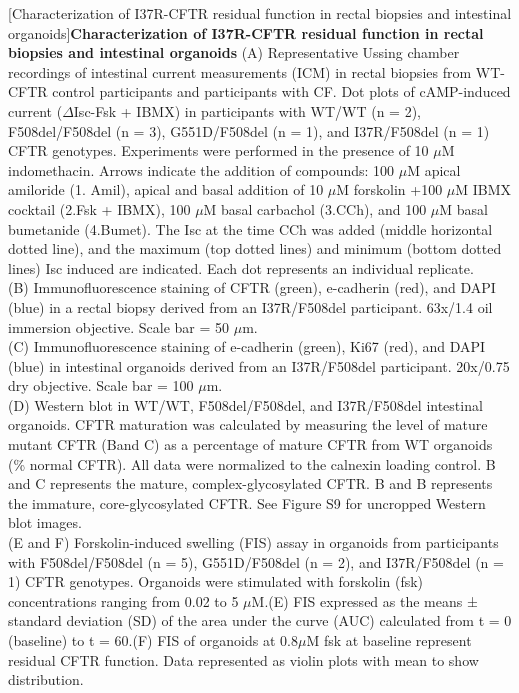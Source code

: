 [Characterization of I37R-CFTR residual function in rectal biopsies and intestinal organoids]{\textbf{Characterization of I37R-CFTR residual function in rectal biopsies and intestinal organoids}}{
(A) Representative Ussing chamber recordings of intestinal current measurements (ICM) in rectal biopsies from WT-CFTR control participants and participants with CF. Dot plots of cAMP-induced current ($\Delta$Isc-Fsk + IBMX) in participants with WT/WT (n = 2), F508del/F508del (n = 3), G551D/F508del (n = 1), and I37R/F508del (n = 1) CFTR genotypes. Experiments were performed in the presence of 10 $\mu$M indomethacin. Arrows indicate the addition of compounds: 100 $\mu$M apical amiloride (1. Amil), apical and basal addition of 10 $\mu$M forskolin +100 $\mu$M IBMX cocktail (2.Fsk + IBMX), 100 $\mu$M basal carbachol (3.CCh), and 100 $\mu$M basal bumetanide (4.Bumet). The Isc at the time CCh was added (middle horizontal dotted line), and the maximum (top dotted lines) and minimum (bottom dotted lines) Isc induced are indicated. Each dot represents an individual replicate.\\

(B) Immunofluorescence staining of CFTR (green), e-cadherin (red), and DAPI (blue) in a rectal biopsy derived from an I37R/F508del participant. 63x/1.4 oil immersion objective. Scale bar = 50 $\mu$m.\\

(C) Immunofluorescence staining of e-cadherin (green), Ki67 (red), and DAPI (blue) in intestinal organoids derived from an I37R/F508del participant. 20x/0.75 dry objective. Scale bar = 100 $\mu$m.\\

(D) Western blot in WT/WT, F508del/F508del, and I37R/F508del intestinal organoids. CFTR maturation was calculated by measuring the level of mature mutant CFTR (Band C) as a percentage of mature CFTR from WT organoids (\% normal CFTR). All data were normalized to the calnexin loading control. B and C represents the mature, complex-glycosylated CFTR. B and B represents the immature, core-glycosylated CFTR. See Figure S9 for uncropped Western blot images.\\

(E and F) Forskolin-induced swelling (FIS) assay in organoids from participants with F508del/F508del (n = 5), G551D/F508del (n = 2), and I37R/F508del (n = 1) CFTR genotypes. Organoids were stimulated with forskolin (fsk) concentrations ranging from 0.02 to 5 $\mu$M.(E) FIS expressed as the means ± standard deviation (SD) of the area under the curve (AUC) calculated from t = 0 (baseline) to t = 60.(F) FIS of organoids at 0.8$\mu$M fsk at baseline represent residual CFTR function. Data represented as violin plots with mean to show distribution.\\

}

